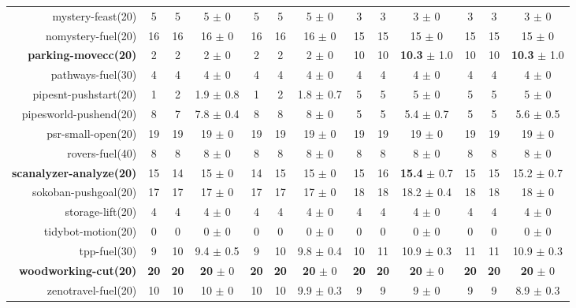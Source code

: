 \begin{center}
\begin{tabular}{|r|*{4}{ccc|}}
mystery-feast(20) & 5 & 5 & 5 $\pm$ 0 & 5 & 5 & 5 $\pm$ 0 & 3 & 3 & 3 $\pm$ 0 & 3 & 3 & 3 $\pm$ 0\\
nomystery-fuel(20) & 16 & 16 & 16 $\pm$ 0 & 16 & 16 & 16 $\pm$ 0 & 15 & 15 & 15 $\pm$ 0 & 15 & 15 & 15 $\pm$ 0\\
\textbf{parking-movecc(20)} & 2 & 2 & 2 $\pm$ 0 & 2 & 2 & 2 $\pm$ 0 & 10 & 10 & \textbf{10.3} $\pm$ 1.0 & 10 & 10 & \textbf{10.3} $\pm$ 1.0\\
pathways-fuel(30) & 4 & 4 & 4 $\pm$ 0 & 4 & 4 & 4 $\pm$ 0 & 4 & 4 & 4 $\pm$ 0 & 4 & 4 & 4 $\pm$ 0\\
pipesnt-pushstart(20) & 1 & 2 & 1.9 $\pm$ 0.8 & 1 & 2 & 1.8 $\pm$ 0.7 & 5 & 5 & 5 $\pm$ 0 & 5 & 5 & 5 $\pm$ 0\\
pipesworld-pushend(20) & 8 & 7 & 7.8 $\pm$ 0.4 & 8 & 8 & 8 $\pm$ 0 & 5 & 5 & 5.4 $\pm$ 0.7 & 5 & 5 & 5.6 $\pm$ 0.5\\
psr-small-open(20) & 19 & 19 & 19 $\pm$ 0 & 19 & 19 & 19 $\pm$ 0 & 19 & 19 & 19 $\pm$ 0 & 19 & 19 & 19 $\pm$ 0\\
rovers-fuel(40) & 8 & 8 & 8 $\pm$ 0 & 8 & 8 & 8 $\pm$ 0 & 8 & 8 & 8 $\pm$ 0 & 8 & 8 & 8 $\pm$ 0\\
\textbf{scanalyzer-analyze(20)} & 15 & 14 & 15 $\pm$ 0 & 14 & 15 & 15 $\pm$ 0 & 15 & 16 & \textbf{15.4} $\pm$ 0.7 & 15 & 15 & 15.2 $\pm$ 0.7\\
sokoban-pushgoal(20) & 17 & 17 & 17 $\pm$ 0 & 17 & 17 & 17 $\pm$ 0 & 18 & 18 & 18.2 $\pm$ 0.4 & 18 & 18 & 18 $\pm$ 0\\
storage-lift(20) & 4 & 4 & 4 $\pm$ 0 & 4 & 4 & 4 $\pm$ 0 & 4 & 4 & 4 $\pm$ 0 & 4 & 4 & 4 $\pm$ 0\\
tidybot-motion(20) & 0 & 0 & 0 $\pm$ 0 & 0 & 0 & 0 $\pm$ 0 & 0 & 0 & 0 $\pm$ 0 & 0 & 0 & 0 $\pm$ 0\\
tpp-fuel(30) & 9 & 10 & 9.4 $\pm$ 0.5 & 9 & 10 & 9.8 $\pm$ 0.4 & 10 & 11 & 10.9 $\pm$ 0.3 & 11 & 11 & 10.9 $\pm$ 0.3\\
\textbf{woodworking-cut(20)} & \textbf{20} & \textbf{20} & \textbf{20} $\pm$ 0 & \textbf{20} & \textbf{20} & \textbf{20} $\pm$ 0 & \textbf{20} & \textbf{20} & \textbf{20} $\pm$ 0 & \textbf{20} & \textbf{20} & \textbf{20} $\pm$ 0\\
zenotravel-fuel(20) & 10 & 10 & 10 $\pm$ 0 & 10 & 10 & 9.9 $\pm$ 0.3 & 9 & 9 & 9 $\pm$ 0 & 9 & 9 & 8.9 $\pm$ 0.3\\
\end{tabular}
\end{center}
